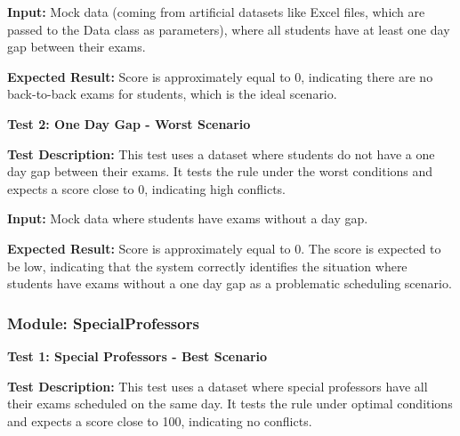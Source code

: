  \textbf{Input:}
Mock data (coming from artificial datasets like Excel files, which are passed to the Data
class as parameters), where all students have at least one day gap between their exams.

\vspace{\baselineskip}

 
 \textbf{Expected Result:}
Score is approximately equal to 0, indicating there are no back-to-back exams
for students, which is the ideal scenario.


\vspace{\baselineskip}

 
 \textbf{Test 2: One Day Gap - Worst Scenario}


\vspace{\baselineskip}

 
 \textbf{Test Description:}
This test uses a dataset where students do not have a one day gap between
their exams. It tests the rule under the worst conditions and expects a score close to 0, indicating
high conflicts.

\vspace{\baselineskip}


 \textbf{Input:}
 Mock data where students have exams without a day gap.
 
\vspace{\baselineskip}

 
 \textbf{Expected Result:}
Score is approximately equal to 0. The score is expected to be low, indicating
that the system correctly identifies the situation where students have exams without a one day
gap as a problematic scheduling scenario.


\vspace{\baselineskip}




 \subsubsection{Module: SpecialProfessors}

 
\vspace{\baselineskip}


 
 \textbf{Test 1: Special Professors - Best Scenario}


\vspace{\baselineskip}

 
 \textbf{Test Description:}
This test uses a dataset where special professors have all their exams
scheduled on the same day. It tests the rule under optimal conditions and expects a score close
to 100, indicating no conflicts.

